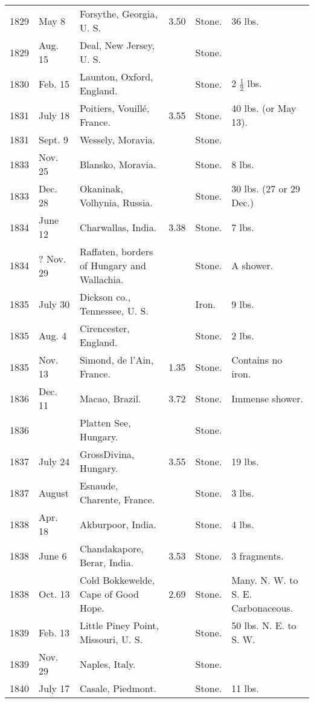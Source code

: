 \documentclass[a4paper, 12pt, oneside]{article}
\begin{document}
\begin{center}
\begin{longtable}{|p{10mm}|p{15mm}|p{32mm}|p{13mm}|p{13mm}|p{26mm}|}
        1829 & May 8 & Forsythe, Georgia, U. S. & 3.50 & Stone. & 36 lbs. \\
        1829 & Aug. 15 & Deal, New Jersey, U. S. & ~ & Stone. & ~ \\
        1830 & Feb. 15 & Launton, Oxford, England. & ~ & Stone. & 2 $\frac{1}{2}$ lbs. \\
        1831 & July 18 & Poitiers, Vouillé, France. & 3.55 & Stone. & 40 lbs. (or May 13). \\
        1831 & Sept. 9 & Wessely, Moravia. & ~ & Stone. & ~ \\
        1833 & Nov. 25 & Blansko, Moravia. & ~ & Stone. & 8 lbs. \\
        1833 & Dec. 28 & Okaninak, Volhynia, Russia. & ~ & Stone. & 30 lbs. (27 or 29 Dec.) \\
        1834 & June 12 & Charwallas, India. & 3.38 & Stone. & 7 lbs. \\
        1834 & ? Nov. 29 & Raffaten, borders of Hungary and Wallachia. & ~ & Stone. & A shower. \\
        1835 & July 30 & Dickson co., Tennessee, U. S. & ~ & Iron. & 9 lbs. \\
        1835 & Aug. 4 & Cirencester, England. & ~ & Stone. & 2 lbs. \\
        1835 & Nov. 13 & Simond, de l’Ain, France. & 1.35 & Stone. & Contains no iron. \\
        1836 & Dec. 11 & Macao, Brazil. & 3.72 & Stone. & Immense shower. \\
        1836 & ~ & Platten See, Hungary. & ~ & Stone. & ~ \\
        1837 & July 24 & Gross\-Divina, Hungary. & 3.55 & Stone. & 19 lbs. \\
        1837 & August & Esnaude, Charente, France. & ~ & Stone. & 3 lbs. \\
        1838 & Apr. 18 & Akburpoor, India. & ~ & Stone. & 4 lbs. \\
        1838 & June 6 & Chandakapore, Berar, India. & 3.53 & Stone. & 3 fragments. \\
        1838 & Oct. 13 & Cold Bokkewelde, Cape of Good Hope. & 2.69 & Stone. & Many. N. W. to S. E. Carbonaceous. \\
        1839 & Feb. 13 & Little Piney Point, Missouri, U. S. & ~ & Stone. & 50 lbs. N. E. to S. W. \\
        1839 & Nov. 29 & Naples, Italy. & ~ & Stone. & ~ \\
        1840 & July 17 & Casale, Piedmont. & ~ & Stone. & 11 lbs. \\

\end{longtable}
\end{center}
\end{document}
